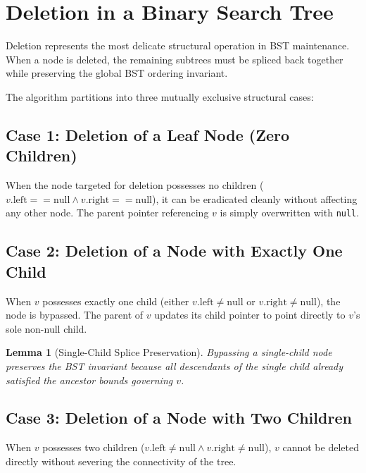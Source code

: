 \documentclass[10pt,journal,compsoc,onecolumn]{IEEEtran}
\newtheorem{lemma}[theorem]{Lemma}
\begin{document}
\section{Deletion in a Binary Search Tree}
\label{sec:deletion}

Deletion represents the most delicate structural operation in BST maintenance. When a node is deleted, the remaining subtrees must be spliced back together while preserving the global BST ordering invariant.

The algorithm partitions into three mutually exclusive structural cases:

\subsection{Case 1: Deletion of a Leaf Node (Zero Children)}
When the node targeted for deletion possesses no children ($v.\mathrm{left} == \mathrm{null} \land v.\mathrm{right} == \mathrm{null}$), it can be eradicated cleanly without affecting any other node. The parent pointer referencing $v$ is simply overwritten with \texttt{null}.

\subsection{Case 2: Deletion of a Node with Exactly One Child}
When $v$ possesses exactly one child (either $v.\mathrm{left} \ne \mathrm{null}$ or $v.\mathrm{right} \ne \mathrm{null}$), the node is bypassed. The parent of $v$ updates its child pointer to point directly to $v$'s sole non-null child.
\begin{lemma}[Single-Child Splice Preservation]
Bypassing a single-child node preserves the BST invariant because all descendants of the single child already satisfied the ancestor bounds governing $v$.
\end{lemma}

\subsection{Case 3: Deletion of a Node with Two Children}
When $v$ possesses two children ($v.\mathrm{left} \ne \mathrm{null} \land v.\mathrm{right} \ne \mathrm{null}$), $v$ cannot be deleted directly without severing the connectivity of the tree.
\end{document}
